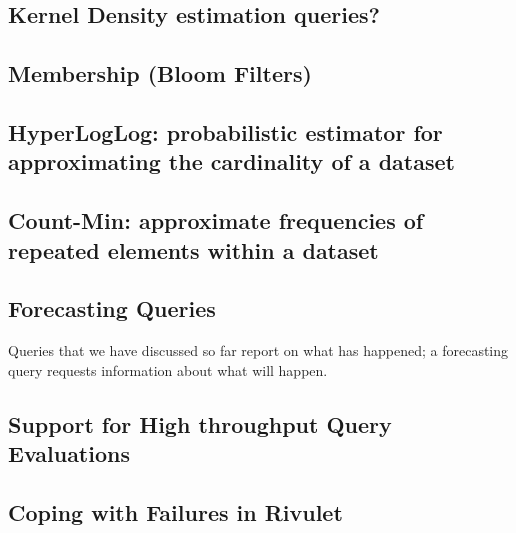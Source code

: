 \subsection{Kernel Density estimation queries?}

\subsection{Membership (Bloom Filters)}

\subsection{HyperLogLog: probabilistic estimator for approximating the cardinality of a dataset}

\subsection{Count-Min: approximate frequencies of repeated elements within a dataset}

\subsection{Forecasting Queries}
Queries that we have discussed so far report on what has happened; a forecasting query requests information about what will happen.

\subsection{Support for High throughput Query Evaluations}

\subsection{Coping with Failures in Rivulet}


